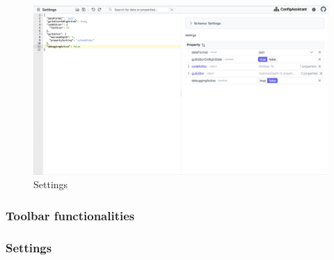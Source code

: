 \begin{figure}[h]
    \includegraphics[width=\textwidth]{figures/settings}
    \caption{Settings}
    \label{fig:settings}
\end{figure}

\subsubsection{Toolbar functionalities}




\subsubsection{Settings}

